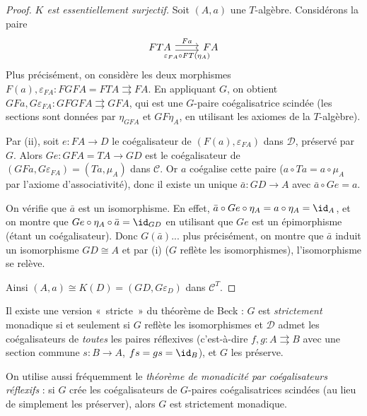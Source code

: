 \begin{proof}
\emph{$K$ est essentiellement surjectif.}
Soit $(A, a)$ une $T$-algèbre. Considérons la paire
\[
\begin{tikzcd}
FTA \arrow[r, shift left, "Fa"] \arrow[r, shift right, "\varepsilon_{FA} \circ FT(\eta_A)"'] &
FA
\end{tikzcd}
\]
Plus précisément, on considère les deux morphismes
$F(a), \varepsilon_{FA} \colon FGFA = FTA \rightrightarrows FA$.
En appliquant $G$, on obtient $GFa, G\varepsilon_{FA} \colon
GFGFA \rightrightarrows GFA$, qui est une $G$-paire coégalisatrice
scindée (les sections sont données par $\eta_{GFA}$ et $GF\eta_A$,
en utilisant les axiomes de la $T$-algèbre).

Par (ii), soit $e \colon FA \to D$ le coégalisateur de
$(F(a), \varepsilon_{FA})$ dans $\mathcal{D}$, préservé par $G$.
Alors $Ge \colon GFA = TA \to GD$ est le coégalisateur de
$(GFa, G\varepsilon_{FA}) = (Ta, \mu_A)$ dans $\mathcal{C}$.
Or $a$ coégalise cette paire ($a \circ Ta = a \circ \mu_A$
par l'axiome d'associativité), donc il existe un unique
$\bar{a} \colon GD \to A$ avec $\bar{a} \circ Ge = a$.

On vérifie que $\bar{a}$ est un isomorphisme.
En effet, $\bar{a} \circ Ge \circ \eta_A = a \circ \eta_A = \id_A$,
et on montre que $Ge \circ \eta_A \circ \bar{a} = \id_{GD}$
en utilisant que $Ge$ est un épimorphisme (étant un coégalisateur).
Donc $G(\bar{a})$... plus précisément, on montre que $\bar{a}$ induit
un isomorphisme $GD \cong A$ et par (i) ($G$ reflète les isomorphismes),
l'isomorphisme se relève.

Ainsi $(A, a) \cong K(D) = (GD, G\varepsilon_D)$ dans $\mathcal{C}^T$.
\end{proof}

\begin{remarque}\label{rem:beck-versions}
Il existe une version «~stricte~» du théorème de Beck :
$G$ est \emph{strictement} monadique si et seulement si
$G$ reflète les isomorphismes et $\mathcal{D}$ admet les
coégalisateurs de \emph{toutes} les paires réflexives
(c'est-à-dire $f, g \colon A \rightrightarrows B$ avec une section
commune $s \colon B \to A$, $fs = gs = \id_B$), et $G$ les préserve.

On utilise aussi fréquemment le \emph{théorème de monadicité par
coégalisateurs réflexifs} :
si $G$ crée les coégalisateurs de $G$-paires coégalisatrices scindées
(au lieu de simplement les préserver), alors $G$ est strictement monadique.
\end{remarque}

